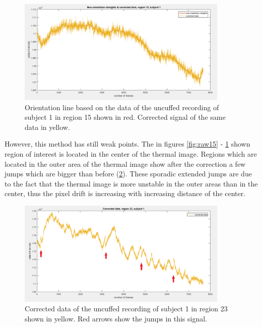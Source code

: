 \begin{figure}[H]
	\includegraphics[width=0.9\textwidth]{figures/corr15}
	\caption{Orientation line based on the data of the uncuffed recording of subject 1 in region 15 shown in red. Corrected signal of the same data in yellow.}
	\label{fig:corr15}
\end{figure}
However, this method has still weak points. The in figures \ref{fig:raw15} - \ref{fig:corr15} shown region of interest is located in the center of the thermal image. Regions which are located in the outer area of the thermal image show after the correction a few jumps which are bigger than before (\ref{fig:corr23}). These sporadic extended jumps are due to the fact that the thermal image is more unstable in the outer areas than in the center, thus the pixel drift is increasing with increasing distance of the center.
\begin{figure}[H]
	\includegraphics[width=0.9\textwidth]{figures/corr23pfeile}
	\caption{Corrected data of the uncuffed recording of subject 1 in region 23 shown in yellow. Red arrows show the jumps in this signal.}
	\label{fig:corr23}
\end{figure}